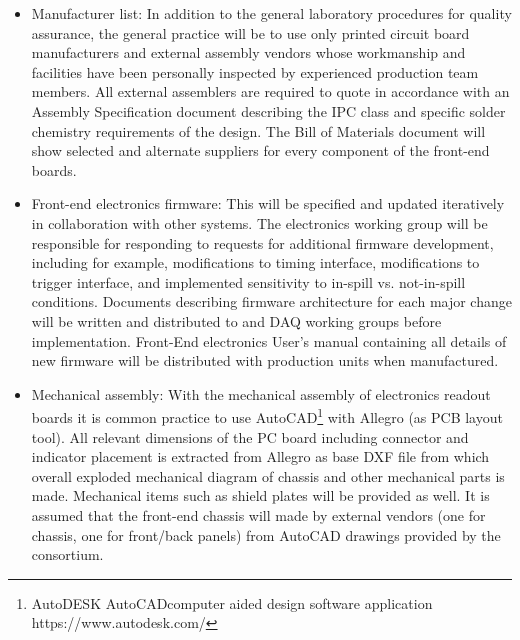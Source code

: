 \begin{itemize}
\item Manufacturer list: In addition to the general laboratory procedures for quality assurance, the general practice will be to use only printed circuit board manufacturers and external assembly vendors whose workmanship and facilities have been personally inspected by experienced production team members. All external assemblers are required to quote in accordance with an Assembly Specification document describing the IPC class and specific solder chemistry requirements of the design. The Bill of Materials document will show selected and alternate suppliers for every component of the front-end boards.

\item Front-end electronics firmware: This will be specified and updated iteratively in collaboration with other systems. The electronics working group will be responsible for responding to requests for additional firmware development, including for example, modifications to timing interface, modifications to trigger interface, and implemented sensitivity to in-spill vs. not-in-spill conditions. Documents describing firmware architecture for each major change will be written and distributed to  and DAQ working groups before implementation. Front-End electronics User's manual containing all details of new firmware will be distributed with production units when manufactured.

\item Mechanical assembly: With the mechanical assembly of electronics readout boards it is common practice to use AutoCAD\footnote{AutoDESK AutoCAD\textregistered computer aided design software application https://www.autodesk.com/} with Allegro (as PCB layout tool). All relevant dimensions of the PC board including connector and indicator placement is extracted from Allegro as base DXF file from which overall exploded mechanical diagram of chassis and other mechanical parts is made. Mechanical items such as shield plates will be provided as well. It is assumed that the front-end chassis will made by external vendors (one for chassis, one for front/back panels) from AutoCAD drawings provided by the consortium.

\end{itemize}
